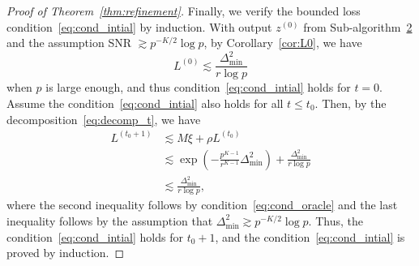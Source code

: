 \documentclass[lettersize,onecolumn,journal]{IEEEtran}
\theoremstyle{definition}
\newtheorem{lem}{Lemma}
\theoremstyle{definition}
\newcommand{\of}[1]{\left(#1\right)}
\newcommand{\offf}[1]{\left\{#1\right\}}
\begin{document}
\begin{proof}[Proof of Theorem~\ref{thm:refinement}]
    Finally, we verify the bounded loss condition~\eqref{eq:cond_intial} by induction.  With output $z^{(0)}$ from Sub-algorithm~\hyperref[alg:main]{2} and the assumption SNR $\gtrsim p^{-K/2} \log p$, by Corollary~\ref{cor:L0}, we have 
    \begin{equation}
        L^{(0)} \lesssim \frac{\Delta_{\min}^2}{r \log p}
    \end{equation}
    when $p$ is large enough, and thus condition~\eqref{eq:cond_intial} holds for $t = 0$. Assume the condition~\eqref{eq:cond_intial} also holds for all $t \leq t_0$. Then, by the decomposition~\eqref{eq:decomp_t}, we have 
    \begin{align}
         L^{(t_0+1)} &\lesssim M \xi + \rho L^{(t_0)} \\
         & \lesssim  \exp \of{  - \frac{p^{K-1}}{r^{K-1}}   \Delta_{\min}^2 } + \frac{\Delta_{\min}^2}{r \log p} \\
         & \lesssim \frac{\Delta_{\min}^2}{r\log p} ,
    \end{align}
    where the second inequality follows by condition~\eqref{eq:cond_oracle} and the last inequality follows by the assumption that $\Delta_{\min}^2 \gtrsim p^{-K/2} \log p$. Thus, the condition~\eqref{eq:cond_intial} holds for $t_0 + 1$, and the condition~\eqref{eq:cond_intial} is proved by induction.
\end{proof}



\end{document}
